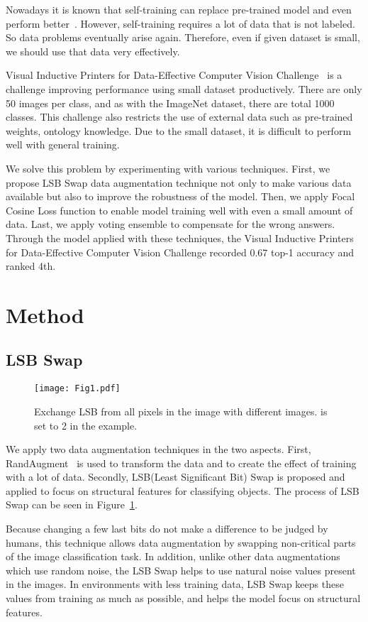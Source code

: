 \documentclass[runningheads]{llncs}
\begin{document}
Nowadays it is known that self-training can replace pre-trained model and even perform better~\cite{zoph2020rethinking,he2019rethinking}. However, self-training requires a lot of data that is not labeled. So data problems eventually arise again. Therefore, even if given dataset is small, we should use that data very effectively.

Visual Inductive Printers for Data-Effective Computer Vision Challenge~\cite{vip2020} is a challenge improving performance using small dataset productively. There are only 50 images per class, and as with the ImageNet dataset, there are total 1000 classes. This challenge also restricts the use of external data such as pre-trained weights, ontology knowledge. Due to the small dataset, it is difficult to perform well with general training.

We solve this problem by experimenting with various techniques. First, we propose LSB Swap data augmentation technique not only to make various data available but also to improve the robustness of the model. Then, we apply Focal Cosine Loss function to enable model training well with even a small amount of data. Last, we apply voting ensemble to compensate for the wrong answers. Through the model applied with these techniques, the Visual Inductive Printers for Data-Effective Computer Vision Challenge recorded 0.67 top-1 accuracy and ranked 4th.


\section{Method}
\subsection{LSB Swap}

\begin{figure}
\centering
\texttt{[image: Fig1.pdf]}
\caption{Exchange  LSB from all pixels in the image with different images.  is set to 2 in the example.}
\label{fig:lsb}
\end{figure}

We apply two data augmentation techniques in the two aspects. First, RandAugment~\cite{cubuk2020randaugment} is used to transform the data and to create the effect of training with a lot of data. Secondly, LSB(Least Significant Bit) Swap is proposed and applied to focus on structural features for classifying objects. The process of LSB Swap can be seen in Figure~\ref{fig:lsb}.

Because changing a few last bits do not make a difference to be judged by humans, this technique allows data augmentation by swapping non-critical parts of the image classification task. In addition, unlike other data augmentations which use random noise, the LSB Swap helps to use natural noise values present in the images. In environments with less training data, LSB Swap keeps these values from training as much as possible, and helps the model focus on structural features.
\end{document}
